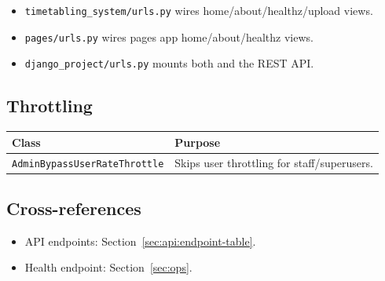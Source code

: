 \begin{itemize}
  \item \texttt{timetabling\_system/urls.py} wires home/about/healthz/upload views.
  \item \texttt{pages/urls.py} wires pages app home/about/healthz views.
  \item \texttt{django\_project/urls.py} mounts both and the REST API.
\end{itemize}

\subsection{Throttling}
\label{subsec:backend:views:throttling}

\begin{longtable}{p{}p{}}
\toprule
\textbf{Class} & \textbf{Purpose} \\
\midrule
\texttt{AdminBypassUserRateThrottle} & Skips user throttling for staff/superusers. \\
\bottomrule
\end{longtable}

\subsection{Cross-references}
\label{subsec:backend:views:links}

\begin{itemize}
  \item API endpoints: Section~\ref{sec:api:endpoint-table}.
  \item Health endpoint: Section~\ref{sec:ops}.
\end{itemize}
